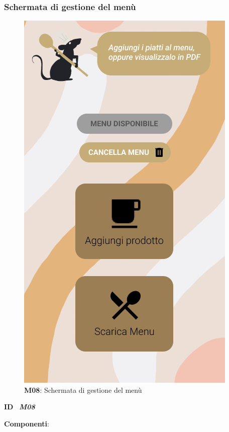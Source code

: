         \subsubsection{Schermata di gestione del menù}
        \begin{figure}[H]
            \centering
            \includegraphics[scale=0.5]{assets/Mockup/Mockup_MenuManager.png}
            \caption{\textbf{M08}: Schermata di gestione del menù}\label{fig:Mockup_MenuManager}
        \end{figure}
        \begin{flushleft}
            \textbf{ID} \ \Large{\textit{\textbf{M08}}}
        \end{flushleft}
        \textbf{Componenti}:

